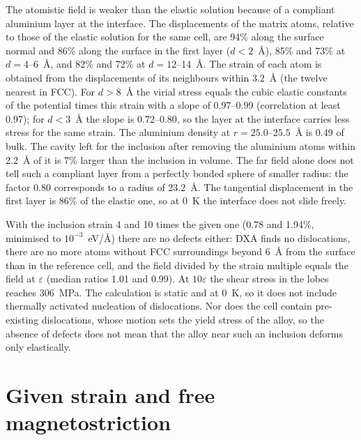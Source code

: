 \documentclass[11pt,a4paper]{article}
\begin{document}
The atomistic field is weaker than the elastic solution because of a compliant
aluminium layer at the interface. The displacements
of the matrix atoms, relative to those of the elastic solution for the same
cell, are 94\% along the surface normal and 86\% along the
surface in the first layer ($d<2$~\AA), 85\% and 73\% at
$d=4$--6~\AA, and 82\% and 72\% at $d=12$--14~\AA. The strain of
each atom is obtained from the displacements of its neighbours within 3.2~\AA{} (the twelve nearest in FCC).
For $d>8$~\AA{} the virial stress equals the cubic elastic constants of the
potential times this strain with a slope of 0.97--0.99 (correlation at least
0.97); for $d<3$~\AA{} the slope is 0.72--0.80, so the layer at the
interface carries less stress for the same strain. The aluminium density at
$r=25.0$--$25.5$~\AA{} is 0.49 of bulk. The cavity left for the
inclusion after removing the aluminium atoms within 2.2~\AA{} of it is
7\% larger than the inclusion in volume. The far field alone does not
tell such a compliant layer from a perfectly bonded sphere of smaller radius:
the factor 0.80 corresponds to a radius of 23.2~\AA. The tangential
displacement in the first layer is 86\% of the elastic one, so at 0~K
the interface does not slide freely.

With the inclusion strain 4 and 10 times the given one (0.78 and 1.94\%,
minimised to $10^{-3}$~eV/\AA) there are no defects either: DXA finds no
dislocations, there are no more atoms without FCC surroundings beyond 6~\AA{}
from the surface than in the reference cell, and the field divided by the
strain multiple equals the field at $\varepsilon$ (median ratios 1.01 and
0.99). At $10\varepsilon$ the shear stress in the lobes reaches
306~MPa. The calculation is static and at 0~K, so it does not include
thermally activated nucleation of dislocations. Nor does the cell contain
pre-existing dislocations, whose motion sets the yield stress of the alloy,
so the absence of defects does not mean that the alloy near such an
inclusion deforms only elastically.

\section{Given strain and free magnetostriction}
\end{document}
